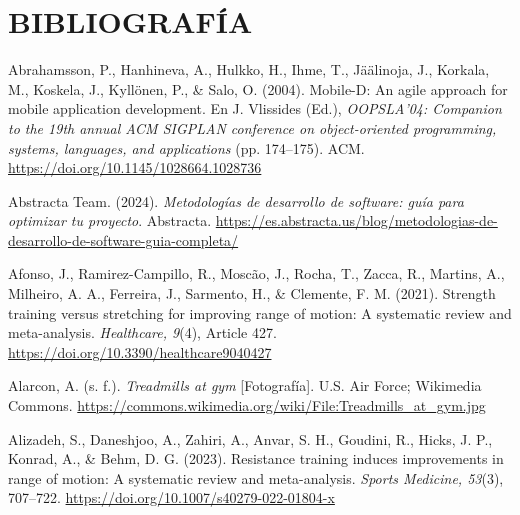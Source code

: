 \chapter*{BIBLIOGRAFÍA}
\label{cap:bibliografia}

\begin{referenciasapa}

\item Abrahamsson, P., Hanhineva, A., Hulkko, H., Ihme, T., Jäälinoja, J., Korkala, M., Koskela, J., Kyllönen, P., \& Salo, O. (2004). Mobile-D: An agile approach for mobile application development. En J. Vlissides (Ed.), \textit{OOPSLA'04: Companion to the 19th annual ACM SIGPLAN conference on object-oriented programming, systems, languages, and applications} (pp. 174--175). ACM. \url{https://doi.org/10.1145/1028664.1028736}

\item Abstracta Team. (2024). \textit{Metodologías de desarrollo de software: guía para optimizar tu proyecto}. Abstracta. \url{https://es.abstracta.us/blog/metodologias-de-desarrollo-de-software-guia-completa/}

\item Afonso, J., Ramirez-Campillo, R., Moscão, J., Rocha, T., Zacca, R., Martins, A., Milheiro, A. A., Ferreira, J., Sarmento, H., \& Clemente, F. M. (2021).
    Strength training versus stretching for improving range of motion: A systematic review and meta-analysis.
    \textit{Healthcare, 9}(4), Article 427.
    \url{https://doi.org/10.3390/healthcare9040427}

\item Alarcon, A. (s. f.). \textit{Treadmills at gym} [Fotografía]. U.S. Air Force; Wikimedia Commons. \url{https://commons.wikimedia.org/wiki/File:Treadmills_at_gym.jpg}

\item Alizadeh, S., Daneshjoo, A., Zahiri, A., Anvar, S. H., Goudini, R., Hicks, J. P., Konrad, A., \& Behm, D. G. (2023). Resistance training induces improvements in range of motion: A systematic review and meta-analysis. \textit{Sports Medicine, 53}(3), 707--722. \url{https://doi.org/10.1007/s40279-022-01804-x}


\end{referenciasapa}
